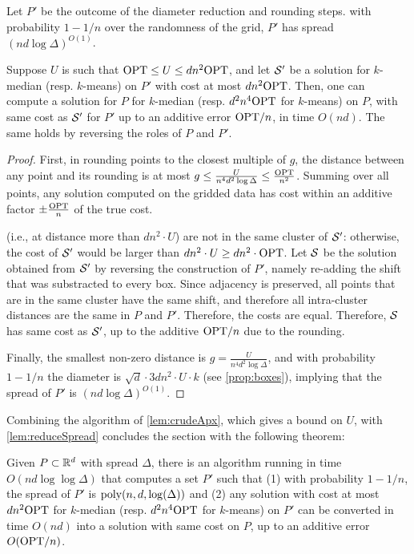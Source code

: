 \begin{lemma}\label{lem:reduceSpread}
Let $P'$ be the outcome of the diameter reduction and rounding steps. with probability $1-1/n$ over the randomness of the grid, $P'$ has spread $(nd \log \Delta)^{O(1)}$.

Suppose $U$ is such that $\text{OPT} \leq U \leq d n^2  \text{OPT}$, and 
let $\mathcal S'$ be a solution for  $k$-median (resp. $k$-means) on $P'$ with cost at most $d n^2 \text{OPT}$. 
Then, one can compute a solution for $P$ for $k$-median (resp. $d^2 n^4 \text{OPT}$ for $k$-means) on $P$, with same cost as $\mathcal S'$ for $P'$ up to an additive error $\text{OPT} / n$, in time $O(nd)$. The same holds by reversing the roles of $P$ and $P'$.
\end{lemma}
\begin{proof}
First, in rounding points to the closest multiple of $g$,
  the distance between any point and its rounding is at most $g \leq \frac{U}{n^4 d^2 \log \Delta} \leq \frac{\text{OPT}}{n^2}$. Summing over all points,
any solution computed on the gridded data has cost within an additive factor $\pm \frac{\text{OPT}}{n}$ of the true cost. 

(i.e., at distance more than $d n^2\cdot U$) are not in the same cluster of $\mathcal S'$: otherwise, the cost of $\mathcal S'$ would be larger than $d n^2\cdot U \geq d n^2\cdot \text{OPT}$. 
 Let $\mathcal S$ be
the solution obtained from $\mathcal S'$ by reversing the construction of $P'$, namely re-adding the shift that was substracted to every box. Since adjacency is preserved, all points that are in the same cluster have the same shift, and therefore all
intra-cluster distances are the same in $P$ and $P'$. Therefore, the costs are equal. Therefore, $\mathcal S$ has same cost as $\mathcal S'$, up to the additive $\text{OPT} /n$ due to the rounding.

Finally, the smallest
non-zero distance is $g = \frac{U}{n^4 d^{2} \log \Delta}$, and with probability $1-1/n$ the diameter is $\sqrt{d} \cdot 3d n^2\cdot U \cdot k$ (see \cref{prop:boxes}), implying that the spread of $P'$ is $(nd \log \Delta)^{O(1)}$.
\end{proof}

Combining the algorithm of \cref{lem:crudeApx}, which gives a bound on $U$, with \cref{lem:reduceSpread} concludes the section with the following theorem:

\begin{theorem}
Given $P \subset \mathbb{R}^d$ with spread $\Delta$, there is an algorithm running in time $O(nd \log \log \Delta)$ that computes a set $P'$ such that (1) with probability $1-1/n$, the spread of $P'$ is $\operatorname{poly}(n,d, \log(\Delta))$ and (2) any solution with cost at most $d n^2 \text{OPT}$ for  $k$-median (resp. $d^2 n^4 \text{OPT}$ for $k$-means) on $P'$ can be converted in time $O(nd)$ into a solution with same cost on $P$, up to an additive error $O(\text{OPT} / n)$.
\end{theorem}
